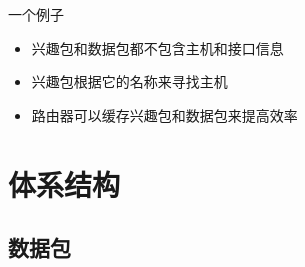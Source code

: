 \documentclass[mathserif]{beamer}
\begin{document}
\begin{frame}{一个例子}
  \begin{itemize}
  \item 兴趣包和数据包都不包含主机和接口信息
  \item 兴趣包根据它的名称来寻找主机
  \item 路由器可以缓存兴趣包和数据包来提高效率
  \end{itemize}
\end{frame}

\section{体系结构}
\subsection{数据包}
\end{document}
